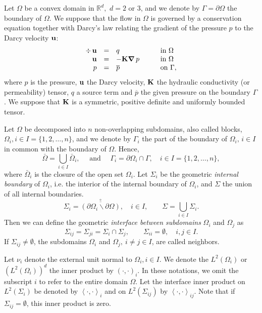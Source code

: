 \documentclass{article}
\newcommand{\run}{{\mathbb R}}
\newcommand{\bral}{\left<}
\newcommand{\brar}{\right>}
\newcommand{\ovl}{\overline}
\newcommand{\p}{\partial}
\newcommand{\nab}{\mbox{\boldmath $\nabla$}}
\begin{document}
Let $\Omega$ be a convex domain in $\run^d,\,\, d=2$ or $3$, and we denote by
$\Gamma=\partial \Omega$ the boundary of $\Omega$. We suppose that the flow in
$\Omega$ is governed by a conservation equation together with Darcy's law
relating the gradient of the pressure $p$ to the Darcy velocity ${\bf u}$:
\begin{equation}\label{prob}\begin{array}{rllll}
\div\,{\bf u} &=& q &\qquad\mbox{in }\Omega\\
{\bf u} &=& -{\bf K }\nab\,p   &\qquad\mbox{in }\Omega\\
p&=&\ovl{p}&\qquad\mbox{on }\Gamma,
\end{array}\end{equation}
where $p$ is the pressure, 
      ${\bf u}$ the Darcy velocity, 
      ${\bf K}$ the hydraulic conductivity (or permeability) tensor,
      $q$ a source term and
      $\overline{p}$ the given pressure on the boundary $\Gamma$.
We suppose that ${\bf K}$ is a symmetric, positive definite and uniformly
bounded tensor.

Let $\Omega$ be decomposed into $n$ non-overlapping subdomains, also called
blocks, $\Omega_i, i\in I=\{1,2,\ldots,n\}$, and we denote by $\Gamma_{i}$ the
part of the boundary of $\Omega_{i},\, i \in I$ in common with the boundary of
$\Omega$. Hence,
\[
\bar\Omega = \bigcup_{i\in I} \bar\Omega_i, 
\quad \mbox{ and } \quad 
\Gamma_{i} = \partial\Omega_{i}\cap\Gamma,\quad i \in I = \{1,2,\ldots,n\},
\]
where $\bar\Omega_i$ is the closure of the open set $\Omega_i$.
Let $\Sigma_{i}$ be the geometric {\it internal boundary} of $\Omega_i$, i.e.
the interior of the internal boundary of $\Omega_i$, and $\Sigma$ the union of
all internal boundaries.
\[
\Sigma_{i} = \stackrel{\circ}{\ovl{(\p \Omega_i \backslash \p \Omega)}},\quad i
\in I, \qquad \Sigma = \bigcup_{i \in I} \Sigma_{i}.
\]
Then we can define the geometric {\it interface between subdomains} $\Omega_i$ and $\Omega_j$ as 
\[
\Sigma_{ij} = \Sigma_{ji} = \Sigma_{i} \cap  \Sigma_{j}, \qquad \Sigma_{ii} = \emptyset,
\quad i, j \in I.
\]
If $\Sigma_{ij} \neq \emptyset$, the subdomains $\Omega_i$ and $\Omega_j, \ 
i \neq j \in I$, are called neighbors. 

Let $\nu_i$ denote the external unit normal to $\Omega_i, i \in I$. We denote
the $L^2(\Omega_i)$ or $(L^2(\Omega_i))^d$ the inner product by $(\cdot,
\cdot)_{i}$. In these notations, we omit the subscript $i$ to refer to the
entire domain $\Omega$. Let the interface inner product on $L^2(\Sigma_i)$ be
denoted by $\bral\cdot, \cdot \brar_i$ and on $L^2(\Sigma_{ij})$ by $\bral
\cdot, \cdot \brar_{ij}$. Note that if $\Sigma_{ij}=\emptyset$, this inner
product is zero.
\end{document}
